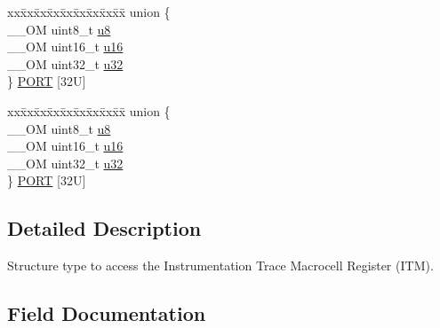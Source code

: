 \begin{DoxyCompactItemize}
\begin{tabbing}
\end{tabbing}\item 
\begin{tabbing}
xx\=xx\=xx\=xx\=xx\=xx\=xx\=xx\=xx\=\kill
union \{\\
\>\_\_OM uint8\_t \mbox{\hyperlink{struct_i_t_m___type_a4c0550e859d614c607bd4b575f05425c}{u8}}\\
\>\_\_OM uint16\_t \mbox{\hyperlink{struct_i_t_m___type_ae93660eefe2482a8564fae9a1ca39739}{u16}}\\
\>\_\_OM uint32\_t \mbox{\hyperlink{struct_i_t_m___type_ae89dd50f788f12863c681fba1a5b60d1}{u32}}\\
\} \mbox{\hyperlink{struct_i_t_m___type_a1e83289e7a6de858bcdc3e124b457732}{PORT}} \mbox{[}32U\mbox{]}\\

\end{tabbing}\item 
\begin{tabbing}
xx\=xx\=xx\=xx\=xx\=xx\=xx\=xx\=xx\=\kill
union \{\\
\>\_\_OM uint8\_t \mbox{\hyperlink{struct_i_t_m___type_a4c0550e859d614c607bd4b575f05425c}{u8}}\\
\>\_\_OM uint16\_t \mbox{\hyperlink{struct_i_t_m___type_ae93660eefe2482a8564fae9a1ca39739}{u16}}\\
\>\_\_OM uint32\_t \mbox{\hyperlink{struct_i_t_m___type_ae89dd50f788f12863c681fba1a5b60d1}{u32}}\\
\} \mbox{\hyperlink{struct_i_t_m___type_a99bba7451f79c00e8684aa0986b74901}{PORT}} \mbox{[}32U\mbox{]}\\

\end{tabbing}\end{DoxyCompactItemize}


\subsection{Detailed Description}
Structure type to access the Instrumentation Trace Macrocell Register (I\+TM). 

\subsection{Field Documentation}
\mbox{\label{struct_i_t_m___type_a26bbad5d9e0f1d302611d52373aef839}} 
